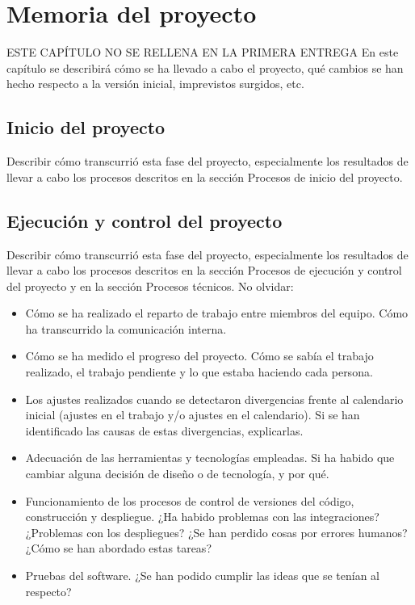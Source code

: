 
\chapter{Memoria del proyecto} %

\label{Chapter5} %


ESTE CAPÍTULO NO SE RELLENA EN LA PRIMERA ENTREGA
En este capítulo se describirá cómo se ha llevado a cabo el proyecto, qué cambios se han hecho respecto a la versión inicial, imprevistos surgidos, etc.
\section{Inicio del proyecto}
Describir cómo transcurrió esta fase del proyecto, especialmente los resultados de llevar a cabo los procesos descritos en la sección Procesos de inicio del proyecto.
\section{Ejecución y control del proyecto}
Describir cómo transcurrió esta fase del proyecto, especialmente los resultados de llevar a cabo los procesos descritos en la sección Procesos de ejecución y control del proyecto y en la sección Procesos técnicos. No olvidar:
\begin{itemize}
	\item Cómo se ha realizado el reparto de trabajo entre miembros del equipo. Cómo ha transcurrido la comunicación interna.
	\item Cómo se ha medido el progreso del proyecto. Cómo se sabía el trabajo realizado, el trabajo pendiente y lo que estaba haciendo cada persona.
	\item Los ajustes realizados cuando se detectaron divergencias frente al calendario inicial (ajustes en el trabajo y/o ajustes en el calendario). Si se han identificado las causas de estas divergencias, explicarlas.
	\item Adecuación de las herramientas y tecnologías empleadas. Si ha habido que cambiar alguna decisión de diseño o de tecnología, y por qué.
	\item Funcionamiento de los procesos de control de versiones del código, construcción y despliegue. ¿Ha habido problemas con las integraciones? ¿Problemas con los despliegues? ¿Se han perdido cosas por errores humanos? ¿Cómo se han abordado estas tareas?
	\item Pruebas del software. ¿Se han podido cumplir las ideas que se tenían al respecto?
\end{itemize}

